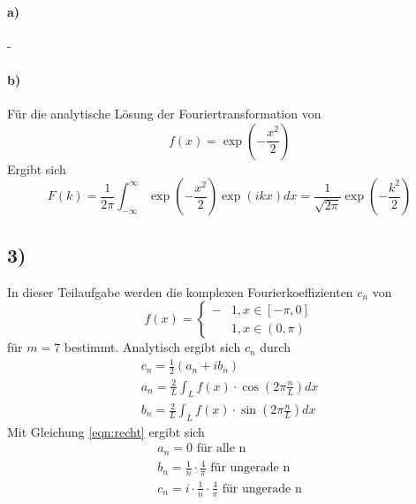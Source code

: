 \paragraph*{a)}
-
\paragraph*{b)}
Für die analytische Lösung der Fouriertransformation von 
\begin{equation}
    f(x) = \exp{\left( - \frac{x^2}{2} \right)}
\end{equation}
Ergibt sich 
\begin{equation}
    F(k) = \frac{1}{2\pi} \int_{-\infty}^{\infty} \exp{\left( - \frac{x^2}{2} \right)} \exp{\left(i k x \right) } dx = \frac{1}{\sqrt{2 \pi}} \exp{\left( - \frac{k^2}{2} \right)}
\end{equation}

\subsection*{3)}
In dieser Teilaufgabe werden die komplexen Fourierkoeffizienten $c_n$ von 
\begin{equation}
    f(x) = \begin{cases}
        -&1, x \in \left[ - \pi, 0\right] \\
         &1, x \in \left(0 , \pi\right)
    \end{cases}
    \label{eqn:recht}
\end{equation}
für $ m = 7 $ bestimmt. 
Analytisch ergibt sich $c_n$ durch 
\begin{align}
    c_n = \frac{1}{2} \left( a_n + i b_n \right) \\
    a_n = \frac{2}{L} \int_L f(x) \cdot \cos(  2\pi \frac{n}{L}) dx \\
    b_n = \frac{2}{L} \int_L f(x) \cdot \sin(  2\pi \frac{n}{L}) dx
\end{align}
Mit Gleichung \eqref{eqn:recht} ergibt sich 
\begin{align}
    a_n = 0 \text{  für alle n} \\
    b_n = \frac{1}{n} \cdot \frac{4}{\pi} \text{    für ungerade n} \\
    c_n = i \cdot \frac{1}{n} \cdot \frac{4}{\pi} \text{    für ungerade n}
\end{align}
